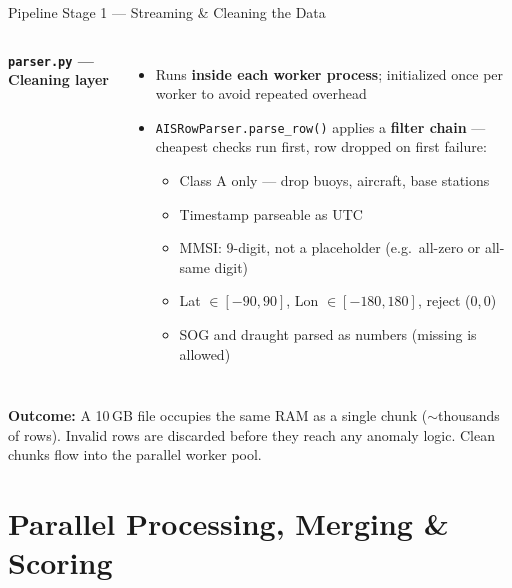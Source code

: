 \documentclass[svgnames, 9pt]{beamer}
\begin{document}
\begin{frame}{Pipeline Stage 1 — Streaming \& Cleaning the Data}
\begin{columns}[T]
        {\scriptsize\color{maincolor}\textbf{\texttt{parser.py} — Cleaning layer}}
        \vspace{0.15em}
        \begin{itemize}\scriptsize
            \item Runs \textbf{inside each worker process}; initialized once
                  per worker to avoid repeated overhead
            \item \texttt{AISRowParser.parse\_row()} applies a \textbf{filter
                  chain} — cheapest checks run first, row dropped on first
                  failure:
            \begin{itemize}\scriptsize
                \item[\color{accentred}$\bullet$] Class A only — drop buoys,
                      aircraft, base stations
                \item[\color{accentred}$\bullet$] Timestamp parseable as UTC
                \item[\color{accentred}$\bullet$] MMSI: 9-digit, not a
                      placeholder (e.g.\ all-zero or all-same digit)
                \item[\color{accentred}$\bullet$] Lat $\in [-90,90]$,
                      Lon $\in [-180,180]$, reject (0,\,0)
                \item[\color{accentred}$\bullet$] SOG and draught parsed as
                      numbers (missing is allowed)
            \end{itemize}
        \end{itemize}

    \end{columns}

    \vspace{0.3em}
    {\scriptsize\color{midgrey}
    \textbf{Outcome:} A 10\,GB file occupies the same RAM as a single chunk
    (${\sim}$thousands of rows). Invalid rows are discarded before they reach
    any anomaly logic. Clean chunks flow into the parallel worker pool.}
\end{frame}

\section{Parallel Processing, Merging \& Scoring}
\end{document}
